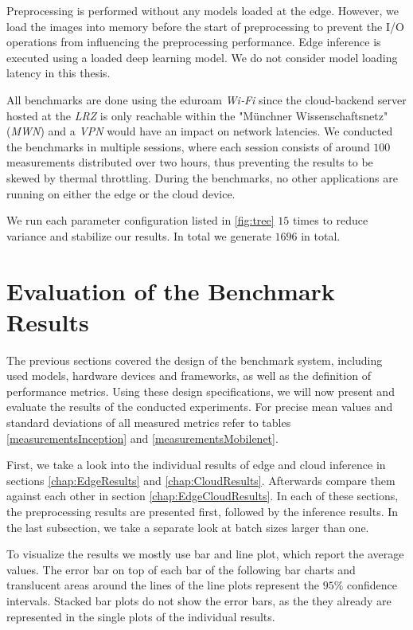 Preprocessing is performed without any models loaded at the edge. However, we load the images into memory before the start of preprocessing to prevent the I/O operations from influencing the preprocessing performance.
Edge inference is executed using a loaded deep learning model. 
We do not consider model loading latency in this thesis.

All benchmarks are done using the eduroam \emph{Wi‑Fi} since the cloud-backend server hosted at the \emph{LRZ} is only reachable within the "Münchner Wissenschaftsnetz" (\emph{MWN}) and a \emph{VPN} would have an impact on network latencies.
We conducted the benchmarks in multiple sessions, where each session consists of around  $100$ measurements distributed over two hours, thus preventing the results to be skewed by thermal throttling.
During the benchmarks, no other applications are running on either the edge or the cloud device.

We run each parameter configuration listed in \ref{fig:tree} $15$ times to reduce variance and stabilize our results. In total we generate $1696$ in total.
\section{Evaluation of the Benchmark Results}
\label{chap:Evaluation}
The previous sections covered the design of the benchmark system, including used models, hardware devices and frameworks, as well as the definition of performance metrics. Using these design specifications, we will now present and evaluate the results of the conducted experiments.
For precise mean values and standard deviations of all measured metrics refer to tables \ref{measurementsInception} and \ref{measurementsMobilenet}.

First, we take a look into the individual results of edge and cloud inference in sections \ref{chap:EdgeResults} and \ref{chap:CloudResults}.
Afterwards compare them against each other in section \ref{chap:EdgeCloudResults}. In each of these sections, the preprocessing results are presented first, followed by the inference results.
In the last subsection, we take a separate look at batch sizes larger than one.

To visualize the results we mostly use bar and line plot, which report the average values.
The error bar on top of each bar of the following bar charts and translucent areas around the lines of the line plots represent the $95\%$ confidence intervals.
Stacked bar plots do not show the error bars, as the they already are represented in the single plots of the individual results.

